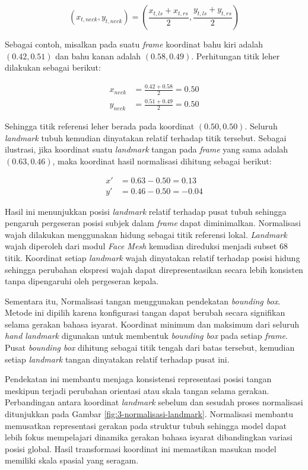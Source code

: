 \[
(x_{t,neck}, y_{t,neck}) = \left( \frac{x_{t,ls} + x_{t,rs}}{2}, \frac{y_{t,ls} + y_{t,rs}}{2} \right)
\]

Sebagai contoh, misalkan pada suatu \textit{frame} koordinat bahu kiri adalah $(0.42, 0.51)$ dan bahu kanan adalah $(0.58, 0.49)$. Perhitungan titik leher dilakukan sebagai berikut:

\[
\begin{aligned}
x_{neck} &= \frac{0.42 + 0.58}{2} = 0.50 \\[8pt]
y_{neck} &= \frac{0.51 + 0.49}{2} = 0.50
\end{aligned}
\]

Sehingga titik referensi leher berada pada koordinat $(0.50, 0.50)$. Seluruh \textit{landmark} tubuh kemudian dinyatakan relatif terhadap titik tersebut. Sebagai ilustrasi, jika koordinat suatu \textit{landmark} tangan pada \textit{frame} yang sama adalah $(0.63, 0.46)$, maka koordinat hasil normalisasi dihitung sebagai berikut:

\[
\begin{aligned}
x' &= 0.63 - 0.50 = 0.13 \\[6pt]
y' &= 0.46 - 0.50 = -0.04
\end{aligned}
\]

Hasil ini menunjukkan posisi \textit{landmark} relatif terhadap pusat tubuh sehingga pengaruh pergeseran posisi subjek dalam \textit{frame} dapat diminimalkan.
Normalisasi wajah dilakukan menggunakan hidung sebagai titik referensi lokal.
\textit{Landmark} wajah diperoleh dari modul \textit{Face Mesh} kemudian direduksi menjadi subset 68 titik.
Koordinat setiap \textit{landmark} wajah dinyatakan relatif terhadap posisi hidung sehingga perubahan ekspresi wajah dapat direpresentasikan secara lebih konsisten tanpa dipengaruhi oleh pergeseran kepala.

Sementara itu, Normalisasi tangan menggunakan pendekatan \textit{bounding box}.
Metode ini dipilih karena konfigurasi tangan dapat berubah secara signifikan selama gerakan bahasa isyarat.
Koordinat minimum dan maksimum dari seluruh \textit{hand landmark} digunakan untuk membentuk \textit{bounding box} pada setiap \textit{frame}.
Pusat \textit{bounding box} dihitung sebagai titik tengah dari batas tersebut, kemudian setiap \textit{landmark} tangan dinyatakan relatif terhadap pusat ini.

Pendekatan ini membantu menjaga konsistensi representasi posisi tangan meskipun terjadi perubahan orientasi atau skala tangan selama gerakan.
Perbandingan antara koordinat \textit{landmark} sebelum dan sesudah proses normalisasi ditunjukkan pada Gambar \ref{fig:3-normalisasi-landmark}.
Normalisasi membantu memusatkan representasi gerakan pada struktur tubuh sehingga model dapat lebih fokus mempelajari dinamika gerakan bahasa isyarat dibandingkan variasi posisi global.
Hasil transformasi koordinat ini memastikan masukan model memiliki skala spasial yang seragam.

